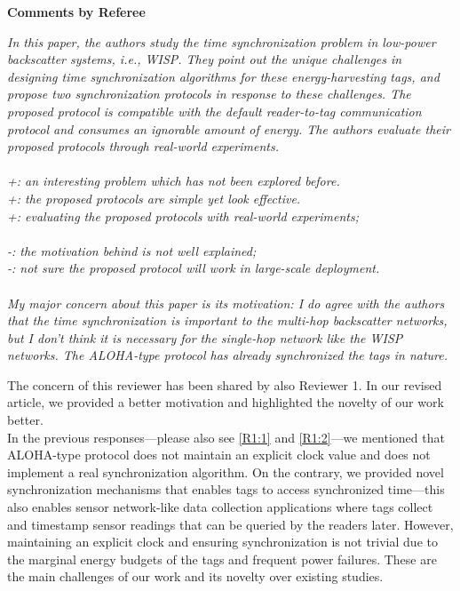 \documentclass[10pt]{article}
\newcommand{\referee}[1]{
	{\item \color{OliveGreen} \emph{{#1}}}
	\label{R\therefereeCounter:\arabic{enumi}}
}
\newcommand{\response}[1]{{\color{blue} #1}}
\newcounter{refereeCounter}
\newenvironment{responses}{%
\refstepcounter{refereeCounter}%
\textbf{\large Comments by Referee \therefereeCounter}
\begin{enumerate}%
\renewcommand{\labelenumi}{\textbf{[R\therefereeCounter :\,\arabic{enumi}]}} %
}{\end{enumerate}}
\begin{document}
\begin{responses}
	
\referee{In this paper, the authors study the time synchronization problem in low-power backscatter systems, i.e., WISP. They point out the unique challenges in designing time synchronization algorithms for these energy-harvesting tags, and propose two synchronization protocols in response to these challenges. The proposed protocol is compatible with the default reader-to-tag communication protocol and consumes an ignorable amount of energy. The authors evaluate their proposed protocols through real-world experiments. \\
\\
+: an interesting problem which has not been explored before. \\
+: the proposed protocols are simple yet look effective. \\
+: evaluating the proposed protocols with real-world experiments; \\
\\		
-: the motivation behind is not well explained; \\
-: not sure the proposed protocol will work in large-scale deployment. \\
\\
My major concern about this paper is its motivation: I do agree with the authors that the time synchronization is important to the multi-hop backscatter networks, but I don’t think it is necessary for the single-hop network like the WISP networks. The ALOHA-type protocol has already synchronized the tags in nature. 
}
	
\response{ 
 The concern of this reviewer has been shared by also Reviewer 1. In our revised article, we provided a better motivation and highlighted the novelty of our work better.  \\
 In the previous responses---please also see \hyperref[R1:1]{[R1:1]} and \hyperref[R1:2]{[R1:2]}---we mentioned that ALOHA-type protocol does not maintain an explicit clock value and does not implement a real synchronization algorithm. On the contrary, we provided novel synchronization mechanisms that enables tags to access synchronized time---this also enables sensor network-like data collection applications where tags collect and timestamp sensor readings that can be queried by the readers later. However, maintaining an explicit clock and ensuring synchronization is not trivial due to the marginal energy budgets of the tags and frequent power failures. These are the main challenges of our work and its novelty over existing studies. 
}
	

\end{responses}
\end{document}
